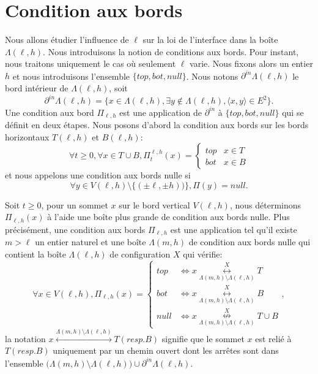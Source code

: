 \documentclass[titlepage,a4paper,12pt]{article}
\begin{document}
\section{Condition aux bords}
Nous allons étudier l'influence de $\ell$ sur la loi de l'interface dans la boîte $\Lambda(\ell,h)$. Nous introduisons la notion de conditions aux bords. Pour instant, nous traitons uniquement le cas où seulement $\ell$ varie. Nous fixons alors un entier $h$ et nous introduisons l'ensemble $\{top,bot,null\}$. Nous notons $\partial^{in}\Lambda(\ell,h)$ le bord intérieur de $\Lambda(\ell,h)$, soit
$$ \partial^{in}\Lambda(\ell,h) = \{x\in \Lambda(\ell,h), \exists y \notin \Lambda(\ell,h), \langle x,y\rangle\in E^2\}.
$$
Une condition aux bord $\Pi_{\ell,h}$ est une application de $\partial^{in}$ à $\{top,bot,null\}$ qui se définit en deux étapes.
Nous posons d'abord la condition aux bords sur les bords horizontaux $T(\ell,h)$ et $B(\ell,h)$:
$$ \forall t\geqslant 0, \forall x\in T\cup B, \Pi_t^{\ell,h}(x) = \left\lbrace \begin{array}{ll}
top & x\in T\\
bot & x\in B
\end{array}
\right.
$$ et nous appelons une condition aux bords nulle si
$$\forall y\in V(\ell,h)\setminus \{(\pm \ell,\pm h))\}, \Pi(y) = null.
$$

Soit $t\geqslant 0$, pour un sommet $x$ sur le bord vertical $V(\ell,h)$, nous déterminons $\Pi_{\ell,h}(x)$ à l'aide une boîte plus grande de condition aux bords nulle. Plus précisément, une condition aux bords $\Pi_{\ell,h}$ est une application tel qu'il existe $m>\ell$ un entier naturel et une boîte $\Lambda(m,h)$ de condition aux bords nulle qui contient la boîte $\Lambda(\ell,h)$ de configuration $X$ qui vérifie:
$$\forall x \in V(\ell,h),\Pi_{\ell,h}(x)=\left\lbrace \begin{array}{cl}
top & \Leftrightarrow x\overset{X}{\underset{\Lambda(m,h) \setminus \Lambda(\ell,h)}{\longleftrightarrow}} T\\
bot & \Leftrightarrow x\overset{X}{\underset{\Lambda(m,h) \setminus \Lambda(\ell,h)}{\longleftrightarrow}} B\\
null & \Leftrightarrow x\overset{X}{\underset{\Lambda(m,h) \setminus \Lambda(\ell,h)}{\nleftrightarrow}} T\cup B 
\end{array} \right.,
$$
la notation $x\overset{\Lambda(m,h) \setminus \Lambda(\ell,h)}{\longleftrightarrow} T(resp. B)$ signifie que le sommet $x$ est relié à $T(resp. B)$ uniquement par un chemin ouvert dont les arrêtes sont dans l'ensemble $\big(\Lambda(m,h) \setminus \Lambda(\ell,h)\big) \cup \partial^{in} \Lambda(\ell,h)$. 
\end{document}
